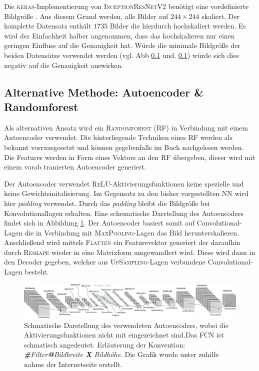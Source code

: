 Die \textsc{keras}-Implementierung von \textsc{InceptionResNetV2} benötigt
eine vordefinierte Bildgröße \cite{keras_InceptionResNetV2}.
Aus diesem Grund werden, alle Bilder auf $244\times 244$ skaliert.
Der komplette Datensatz enthält $1735$ Bilder die hierdurch hochskaliert werden.
Es wird der Einfachheit halber angenommen, dass das hochskalieren nur einen
geringen Einfluss auf die Genauigkeit hat. Würde die minimale
Bildgröße der beiden Datensätze verwendet werden (vgl. Abb \ref{} und. \ref{})
würde sich dies negativ auf die Genauigkeit auswirken.

\subsection{Alternative Methode: Autoencoder \& Randomforest}
Als alternativen Ansatz wird ein \textsc{Randomforest} (RF)
in Verbindung mit einem Autoencoder verwendet.
Die hinterliegende Techniken eines RF werden als bekannt vorrausgesetzt und können
gegebenfalls im Buch \cite[S. 181]{hands_on_machine_learning} nachgelesen werden.
Die Features werden in Form eines Vektors an den RF übergeben,
dieser wird mit einem vorab tranierten Autoencoder generiert.

Der Autoencoder verwendet \textsc{ReLU}-Aktivierungsfunktionen
keine spezielle und keine Gewichtsinitalisierung.
Im Gegensatz zu den bisher vorgestellten NN wird hier
\emph{padding} verwendet. Durch das \emph{padding} bleibt die Bildgröße
bei Konvolutionallagen erhalten.
Eine schematische Darstellung des Autoencoders findet sich in Abbildung \ref{fig:Autoencoder}.
Der Autoencoder basiert somit auf Convolutional-Lagen die in Verbindung mit
\textsc{MaxPooling}-Lagen das Bild herunterskalieren. Anschließend wird
mittels \textsc{Flatten} ein Featurevektor generiert der daraufhin durch
\textsc{Reshape} wieder in eine Matrixform umgewandlert wird. Diese wird dann
in den Decoder gegeben, welcher aus \textsc{UpSampling}-Lagen verbundene
Convolutional-Lagen besteht.
\begin{figure}
\centering
\includegraphics[width=\the\textwidth]{../../final_data/general/autoencoder.pdf}
\caption{Schmatische Darstellung des verwendeten Autoencoders, wobei
         die Aktivierungsfunktionen nicht mit eingezeichnet sind.Das FCN
         ist schmatisch angedeutet. Erläuterung der Konvention: \emph{\textbf{\#}Filter\textbf{@}Bildbreite \textbf{X} Bildhöhe}.
         Die Grafik wurde unter zuhilfe nahme der Internetseite \cite{net_svg_source} erstellt.}
\label{fig:Autoencoder}
\end{figure}
